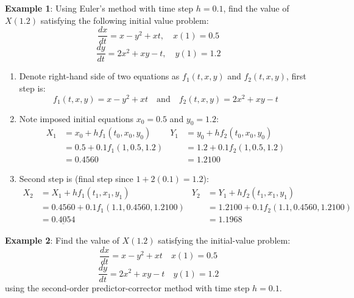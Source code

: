 \documentclass[10pt,a4paper]{article}
\begin{document}
\textbf{Example 1}: Using Euler's method with time step $h=0.1$, find the value of $X(1.2)$
satisfying the following initial value problem:
$$
    \frac{dx}{dt}=x-y^2+xt, \quad x(1)=0.5
$$
$$
    \frac{dy}{dt}=2x^2+xy-t, \quad y(1)=1.2
$$
\begin{enumerate}
    \item Denote right-hand side of two equations as $f_1(t,x,y)$ and $f_2(t,x,y)$, first step is:
    $$
        f_1(t,x,y)=x-y^2+xt \quad \text{and} \quad f_2(t,x,y)=2x^2+xy-t
    $$

    \item Note imposed initial equations $x_0=0.5$ and $y_0=1.2$:
    \begin{align*}
        X_1&=x_0+hf_1(t_0,x_0,y_0) & Y_1&=y_0+hf_2(t_0,x_0,y_0) \\
        &= 0.5 + 0.1f_1(1,0.5,1.2) & &=1.2+0.1f_2(1,0.5,1.2) \\
        &= 0.4560 & &= 1.2100
    \end{align*}

    \item Second step is (final step since $1+2(0.1) = 1.2$):
    \begin{align*}
        X_2&=X_1+hf_1(t_1,x_1,y_1) & Y_2&=Y_1+hf_2(t_1,x_1,y_1) \\
        &= 0.4560 + 0.1f_1(1.1,0.4560,1.2100) & &=1.2100+0.1f_2(1.1,0.4560,1.2100) \\
        &= \underline{0.4054} & &= 1.1968
    \end{align*}
\end{enumerate}

\textbf{Example 2}: Find the value of $X(1.2)$ satisfying the initial-value problem:
$$
    \frac{dx}{dt}=x-y^2+xt \quad x(1)=0.5 
$$
$$
    \frac{dy}{dt}=2x^2+xy-t \quad y(1)=1.2
$$
using the second-order predictor-corrector method with time step $h=0.1$.
\end{document}
